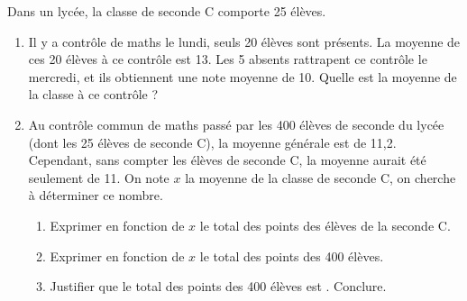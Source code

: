 \documentclass[a4paper,11pt,DIV12,BCOR2mm]{scrartcl}
\begin{document}
\begin{exercice}
 Dans un lycée, la  classe de seconde C comporte 25 élèves. 
\begin{enumerate}
 \item Il y a contrôle de maths le lundi, seuls 20 élèves sont présents.
La moyenne de ces 20 élèves à ce contrôle est 13. Les 5 absents rattrapent ce contrôle le mercredi, et ils obtiennent
une note moyenne de 10. Quelle est la moyenne de la classe à ce contrôle ?
 \item Au contrôle commun de maths passé par les 400 élèves de seconde du lycée (dont les 25 élèves de seconde C), la moyenne générale est de 11,2.
Cependant, sans compter les élèves de seconde C, la moyenne aurait été seulement de 11. On note $x$ la moyenne de la classe de seconde C,
on cherche à déterminer ce nombre.
    \begin{enumerate}
      \item Exprimer en fonction de $x$ le total des points des élèves de la seconde C.
      \item Exprimer en fonction de $x$ le total des points des 400 élèves.
      \item Justifier que le total des points des 400 élèves est . Conclure.
    \end{enumerate}
\end{enumerate}
\end{exercice}
\end{document}
